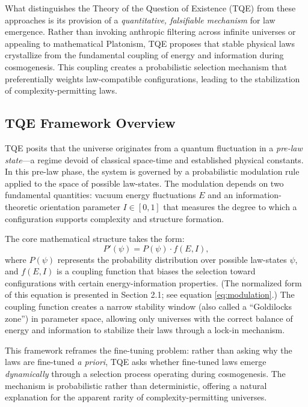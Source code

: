 \documentclass[12pt,a4paper]{article}
\theoremstyle{definition}
\theoremstyle{remark}
\begin{document}
What distinguishes the Theory of the Question of Existence (TQE) from these approaches is its provision of a \emph{quantitative, falsifiable mechanism} for law emergence. Rather than invoking anthropic filtering across infinite universes or appealing to mathematical Platonism, TQE proposes that stable physical laws crystallize from the fundamental coupling of energy and information during cosmogenesis. This coupling creates a probabilistic selection mechanism that preferentially weights law-compatible configurations, leading to the stabilization of complexity-permitting laws.

\subsection{TQE Framework Overview}

TQE posits that the universe originates from a quantum fluctuation in a \emph{pre-law state}—a regime devoid of classical space-time and established physical constants. In this pre-law phase, the system is governed by a probabilistic modulation rule applied to the space of possible law-states. The modulation depends on two fundamental quantities: vacuum energy fluctuations $E$ and an information-theoretic orientation parameter $I \in [0,1]$ that measures the degree to which a configuration supports complexity and structure formation.

The core mathematical structure takes the form:
\begin{equation}\label{eq:core}
P'(\psi) = P(\psi) \cdot f(E, I),
\end{equation}
where $P(\psi)$ represents the probability distribution over possible law-states $\psi$, and $f(E,I)$ is a coupling function that biases the selection toward configurations with certain energy-information properties. (The normalized form of this equation is presented in Section 2.1; see equation \eqref{eq:modulation}.) The coupling function creates a narrow stability window (also called a ``Goldilocks zone'') in parameter space, allowing only universes with the correct balance of energy and information to stabilize their laws through a lock-in mechanism.

This framework reframes the fine-tuning problem: rather than asking why the laws are fine-tuned \emph{a priori}, TQE asks whether fine-tuned laws emerge \emph{dynamically} through a selection process operating during cosmogenesis. The mechanism is probabilistic rather than deterministic, offering a natural explanation for the apparent rarity of complexity-permitting universes.
\end{document}

